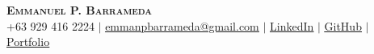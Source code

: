 \documentclass[legal,10pt]{article}
\begin{document}

\begin{center}
    \textbf{\Huge \scshape Emmanuel P. Barrameda} \\ \vspace{1pt}
    \small +63 929 416 2224 $|$ \href{mailto:emmanpbarrameda@gmail.com}{\underline{emmanpbarrameda@gmail.com}} $|$ 
    \href{https://linkedin.com/in/emmanpbarrameda}{\underline{LinkedIn}} $|$
    \href{https://github.com/emmanpbarrameda}{\underline{GitHub}} $|$
    \href{https://emmanpbarrameda.github.io/}{\underline{Portfolio}}
\end{center}




\end{document}
